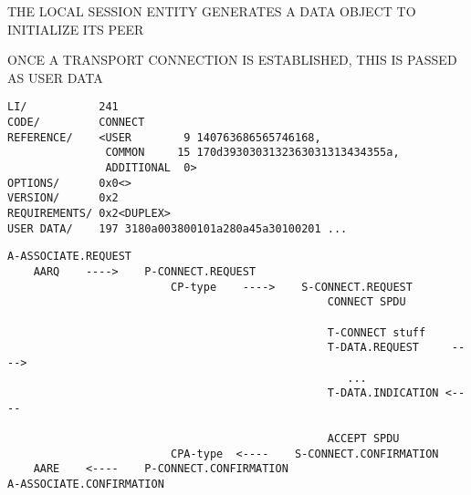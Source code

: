 \begin{bwslide}

\begin{nrtc}
\item	THE LOCAL SESSION ENTITY GENERATES A DATA OBJECT TO INITIALIZE
	ITS PEER

\item	ONCE A TRANSPORT CONNECTION IS ESTABLISHED, THIS IS PASSED AS USER DATA
\end{nrtc}
\end{bwslide}


\begin{bwslide}

\smaller
\begin{verbatim}
LI/           241
CODE/         CONNECT
REFERENCE/    <USER        9 140763686565746168,
               COMMON     15 170d3930303132363031313434355a,
               ADDITIONAL  0>
OPTIONS/      0x0<>
VERSION/      0x2
REQUIREMENTS/ 0x2<DUPLEX>
USER DATA/    197 3180a003800101a280a45a30100201 ...
\end{verbatim}
\end{bwslide}


\begin{bwslide}

\scriptsize
\begin{verbatim}
A-ASSOCIATE.REQUEST
    AARQ    ---->    P-CONNECT.REQUEST
                         CP-type    ---->    S-CONNECT.REQUEST
                                                 CONNECT SPDU

                                                 T-CONNECT stuff
                                                 T-DATA.REQUEST     ---->
                                                    ...
                                                 T-DATA.INDICATION <----

                                                 ACCEPT SPDU
                         CPA-type  <----    S-CONNECT.CONFIRMATION
    AARE    <----    P-CONNECT.CONFIRMATION
A-ASSOCIATE.CONFIRMATION
\end{verbatim}
\end{bwslide}


